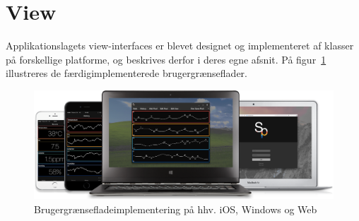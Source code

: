 \section{View}
Applikationslagets view-interfaces er blevet designet og implementeret af klasser på forskellige platforme, og beskrives derfor i deres egne afsnit. På figur~\ref{fig:view_family} illustreres de færdigimplementerede brugergrænseflader. 

\begin{figure}
	\centering
	\includegraphics[width=1.0\linewidth]{figs/implementering/view_family}
	\caption{Brugergrænsefladeimplementering på hhv. iOS, Windows og Web}
	\label{fig:view_family}
\end{figure}